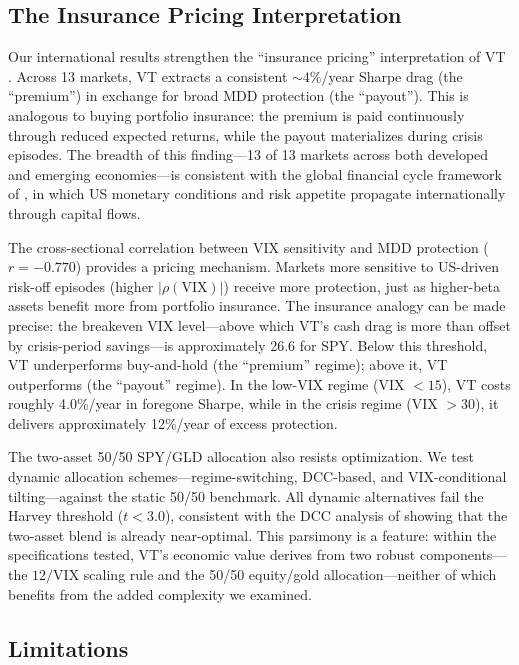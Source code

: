 \documentclass[12pt,a4paper]{article}
\begin{document}
\subsection{The Insurance Pricing Interpretation}

Our international results strengthen the ``insurance pricing'' interpretation of VT \citep{lai2026a}. Across 13 markets, VT extracts a consistent ${\sim}4\%$/year Sharpe drag (the ``premium'') in exchange for broad MDD protection (the ``payout''). This is analogous to buying portfolio insurance: the premium is paid continuously through reduced expected returns, while the payout materializes during crisis episodes. The breadth of this finding---13 of 13 markets across both developed and emerging economies---is consistent with the global financial cycle framework of \citet{miranda2020}, in which US monetary conditions and risk appetite propagate internationally through capital flows.

The cross-sectional correlation between VIX sensitivity and MDD protection ($r = -0.770$) provides a pricing mechanism. Markets more sensitive to US-driven risk-off episodes (higher $|\rho(\text{VIX})|$) receive more protection, just as higher-beta assets benefit more from portfolio insurance. The insurance analogy can be made precise: the breakeven VIX level---above which VT's cash drag is more than offset by crisis-period savings---is approximately 26.6 for SPY. Below this threshold, VT underperforms buy-and-hold (the ``premium'' regime); above it, VT outperforms (the ``payout'' regime). In the low-VIX regime (VIX $< 15$), VT costs roughly 4.0\%/year in foregone Sharpe, while in the crisis regime (VIX $> 30$), it delivers approximately 12\%/year of excess protection.

The two-asset 50/50 SPY/GLD allocation also resists optimization. We test dynamic allocation schemes---regime-switching, DCC-based, and VIX-conditional tilting---against the static 50/50 benchmark. All dynamic alternatives fail the Harvey threshold ($t < 3.0$), consistent with the DCC analysis of \citet{lai2026a} showing that the two-asset blend is already near-optimal. This parsimony is a feature: within the specifications tested, VT's economic value derives from two robust components---the $12/\text{VIX}$ scaling rule and the 50/50 equity/gold allocation---neither of which benefits from the added complexity we examined.

\subsection{Limitations}
\end{document}
